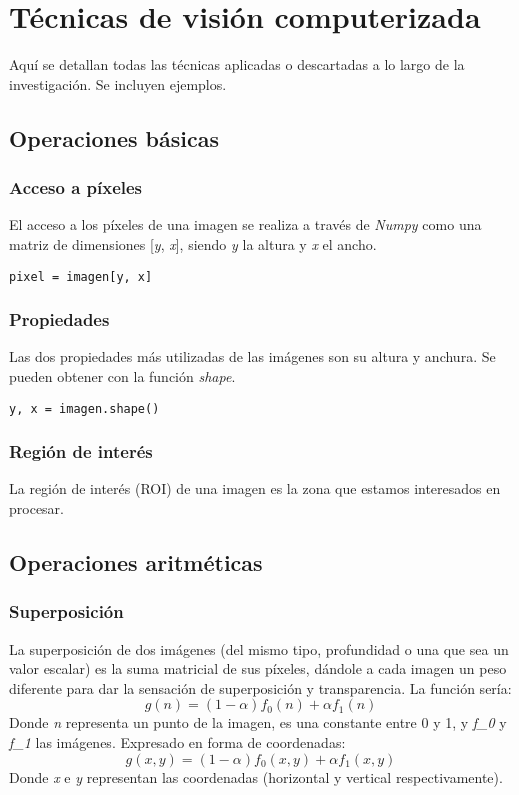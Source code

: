 \chapter{Técnicas de visión computerizada}
Aquí se detallan todas las técnicas aplicadas o descartadas 
a lo largo de la investigación. Se incluyen ejemplos.
\section{Operaciones básicas}
\subsection{Acceso a píxeles}
El acceso a los píxeles de una imagen se realiza a través de
\emph{Numpy} como una matriz de dimensiones [\emph{y}, \emph{x}],
siendo \emph{y} la altura y \emph{x} el ancho.
\begin{verbatim}
pixel = imagen[y, x]
\end{verbatim}

\subsection{Propiedades}
Las dos propiedades más utilizadas de las imágenes son su altura y anchura.
Se pueden obtener con la función \emph{shape}.
\begin{verbatim}
y, x = imagen.shape()
\end{verbatim}

\subsection{Región de interés}
La región de interés (ROI) de una imagen es la zona que estamos
interesados en procesar.

\section{Operaciones aritméticas}
\subsection{Superposición}
La superposición de dos imágenes (del mismo tipo, profundidad o una
que sea un valor escalar) es la suma matricial de sus píxeles,
dándole a cada imagen un peso diferente para dar la sensación
de superposición y transparencia. La función sería:
\begin{equation*}
g(n) = (1 - \alpha)f_0(n) + \alpha f_1(n)
\end{equation*}
Donde \emph{n} representa un punto de la imagen, \emph{\alpha} es 
una constante entre 0 y 1, y \emph{f_0} y \emph{f_1} las imágenes.
Expresado en forma de coordenadas:
\begin{equation*}
g(x, y) = (1 - \alpha)f_0(x, y) + \alpha f_1(x, y)
\end{equation*}
Donde \emph{x} e \emph{y} representan las coordenadas (horizontal y 
vertical respectivamente).


